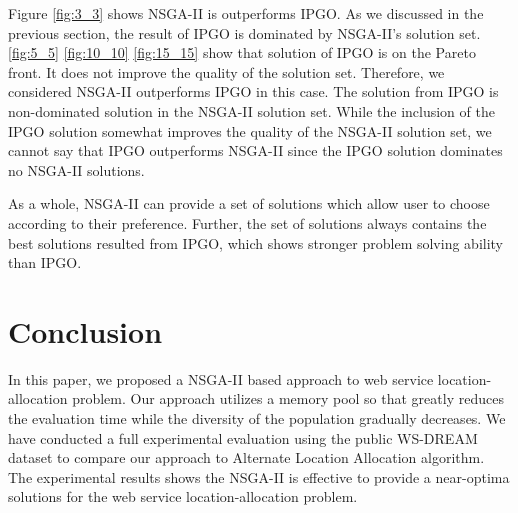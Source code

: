 \documentclass{llncs}
\begin{document}
Figure \ref{fig:3_3} shows NSGA-II is outperforms IPGO. As we discussed in the previous section, the 
result of IPGO is dominated by NSGA-II's solution set. \ref{fig:5_5} \ref{fig:10_10} \ref{fig:15_15} show that solution of IPGO is on the Pareto front. It does not improve the quality of the solution
set. Therefore, we considered NSGA-II outperforms IPGO in this case. The solution from IPGO is non-dominated solution in the NSGA-II solution set. While the inclusion
of the IPGO solution somewhat improves the quality of the NSGA-II solution set, we cannot say that IPGO outperforms NSGA-II since the 
IPGO solution dominates no NSGA-II solutions.

As a whole, NSGA-II can provide a set of solutions which allow user to choose according to their preference. Further, the set of 
solutions always contains the best solutions resulted from IPGO, which shows stronger problem solving ability than IPGO.


\section{Conclusion}
In this paper, we proposed a NSGA-II based approach to web service location-allocation problem. 
Our approach utilizes a memory pool so that
greatly reduces the evaluation time while the diversity of the population gradually decreases. We have conducted a full experimental evaluation using the public WS-DREAM dataset to compare our approach to Alternate Location Allocation algorithm. 
The experimental results shows the NSGA-II is effective to provide a near-optima solutions for the web service location-allocation problem.




\end{document}
